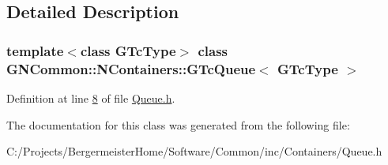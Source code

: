 \subsection{Detailed Description}
\subsubsection*{template$<$class G\+Tc\+Type$>$\newline
class G\+N\+Common\+::\+N\+Containers\+::\+G\+Tc\+Queue$<$ G\+Tc\+Type $>$}



Definition at line \mbox{\hyperlink{_queue_8h_source_l00008}{8}} of file \mbox{\hyperlink{_queue_8h_source}{Queue.\+h}}.



The documentation for this class was generated from the following file\+:\begin{DoxyCompactItemize}
\item 
C\+:/\+Projects/\+Bergermeister\+Home/\+Software/\+Common/inc/\+Containers/Queue.\+h\end{DoxyCompactItemize}
